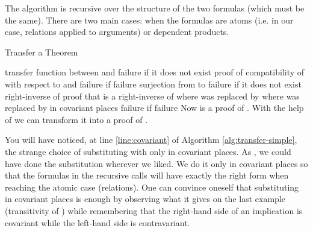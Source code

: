 \documentclass{llncs}
\newcommand*\Let[2]{\State #1  #2}
\begin{document}
The algorithm is recursive over the structure of the two formulas (which must be the same).
There are two main cases: when the formulas are atoms (i.e. in our case, relations applied
to arguments) or dependent products.

\begin{algorithm}
  \caption{Transfer a Theorem
    \label{alg:transfer-simple}}
  \begin{algorithmic}[5]
    \Statex
        \If{}
            \State \Return{}
        \ElsIf{}
            \Let{}{transfer function between  and }
            \State \Comment \Return failure if it does not exist
            \Let{}{proof of compatibility of 
            with respect to  and }
            \For{}
                \If{}
                    \State {}
                \EndIf
            \EndFor
            \State \Return{}
        \ElsIf{}
            \Let{}{}
            \Let{}{}
                \Let{}{
                }
                \State \Comment \Return failure if  failure
                \State \Return 
            \Else
                \Let{}{surjection from  to }
                \Comment \Return failure if it does not exist
                \Let{}{right-inverse of }
                \Let{}{proof that  is a right-inverse of }
                \Let{}{ where  was replaced by }
                \Let{}{ where  was replaced by  in covariant places} \label{line:covariant}
                \Let{}{}
                \State \Comment \Return failure if  failure
                \State Now  is a proof of
                .
                With the help of  we can transform it into 
                a proof of .
                \State \Return 
            \EndIf
        \Else
            \State {}
        \EndIf
    \EndFunction
  \end{algorithmic}
\end{algorithm}

You will have noticed, at line \ref{line:covariant} of Algorithm
\ref{alg:transfer-simple}, the strange choice of substituting  with
 only in covariant places. As , we could
have done the substitution wherever we liked. We do it only in
covariant places so that the formulas in the recursive calls will have
exactly the right form when reaching the atomic case (relations).
One can convince oneself that substituting in covariant
places is enough by observing what it gives on the last example
(transitivity of )
while remembering that the right-hand side of an
implication is covariant while the left-hand side is contravariant.
\end{document}
